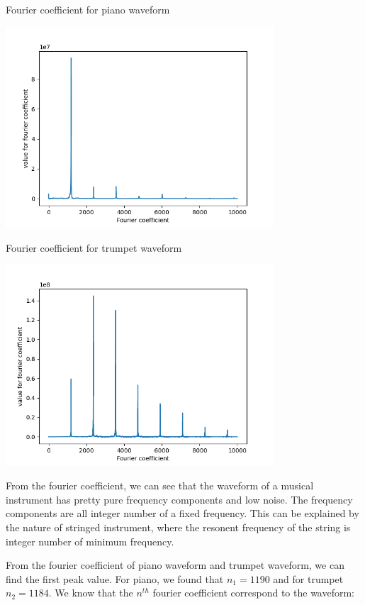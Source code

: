 \documentclass[letterpaper,12pt]{article}
\begin{document}
\begin{table}[!h]
    \centering
    \caption{Fourier coefficient for piano waveform}
    \includegraphics[width=10cm]{8-2-5.png}
\end{table}%

\begin{table}[!h]
    \centering
    \caption{Fourier coefficient for trumpet waveform}
    \includegraphics[width=10cm]{8-2-6.png}
\end{table}%
\newpage

From the fourier coefficient, we can see that the waveform of a musical instrument has pretty pure frequency components and low noise. The frequency components are all integer number of a fixed frequency. This can be explained by the nature of stringed instrument, where the resonent frequency of the string is integer number of minimum frequency.

From the fourier coefficient of piano waveform and trumpet waveform, we can find the first peak value. For piano, we found that $n_1 = 1190$ and for trumpet $n_2 = 1184$. We know that the $n^{th}$ fourier coefficient correspond to the waveform:
\end{document}
